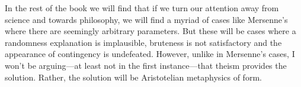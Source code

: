 In the rest of the book we will find that if we turn our attention away from science and towards philosophy, we will
find a myriad of cases like Mersenne's where there are seemingly arbitrary parameters. But these will be cases where
a randomness explanation is implausible, bruteness is not satisfactory and the appearance of contingency is undefeated. However, 
unlike in Mersenne's cases, I won't be arguing---at least not in the first instance---that theism provides the solution. Rather, the 
solution will be Aristotelian metaphysics of form.
\chaptertail 

